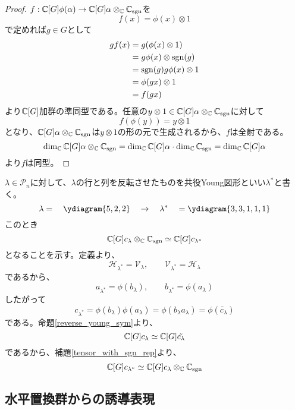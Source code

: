 \documentclass{ltjsreport}
\begin{document}
\begin{proof}
  $f:\mathbb{C}[G]\phi(\alpha)\rightarrow\mathbb{C}[G]\alpha\otimes_{\mathbb{C}} \mathbb{C}_{\mathrm{sgn}}$を
  \[
  f(x)=\phi(x)\otimes 1  
  \]
  で定めれば$g\in G$として
  \begin{align*}
    gf(x)
    &=g(\phi(x)\otimes 1)\\
    &=g\phi(x)\otimes \mathrm{sgn}(g)\\
    &=\mathrm{sgn}(g)g\phi(x)\otimes 1\\
    &=\phi(gx)\otimes 1\\
    &=f(gx)
  \end{align*}
  より$\mathbb{C}[G]$加群の準同型である。任意の$y\otimes 1\in \mathbb{C}[G]\alpha\otimes_{\mathbb{C}} \mathbb{C}_{\mathrm{sgn}}$に対して
  \[
  f(\phi(y))=y\otimes 1  
  \]
  となり、$\mathbb{C}[G]\alpha\otimes_{\mathbb{C}} \mathbb{C}_{\mathrm{sgn}}$は$y\otimes 1$の形の元で生成されるから、$f$は全射である。
  \[
  \dim_{\mathbb{C}}\mathbb{C}[G]\alpha\otimes_{\mathbb{C}} \mathbb{C}_{\mathrm{sgn}}=\dim_{\mathbb{C}}\mathbb{C}[G]\alpha\cdot\dim_{\mathbb{C}}\mathbb{C}_{\mathrm{sgn}}=  \dim_{\mathbb{C}}\mathbb{C}[G]\alpha 
  \]
  より$f$は同型。
\end{proof}


\begin{eg}
  $\lambda\in\mathcal{P}_n$に対して、$\lambda$の行と列を反転させたものを共役Young図形といい$\lambda^*$と書く。
  \[
  \lambda=\quad\ydiagram{5,2,2}\quad\rightarrow\quad\lambda^*\quad=\ydiagram{3,3,1,1,1}
  \]
  このとき
  \[
  \mathbb{C}[G]{c_\lambda}\otimes_{\mathbb{C}}\mathbb{C}_{\mathrm{sgn}}\simeq \mathbb{C}[G]{c_{\lambda^*}}
  \]
  となることを示す。定義より、
  \[
  \mathcal{H}_{\lambda^*}=\mathcal{V}_{\lambda},\qquad
  \mathcal{V}_{\lambda^*}=\mathcal{H}_{\lambda}  
  \]
  であるから、
  \[
  a_{\lambda^*}=\phi(b_{\lambda}),\qquad b_{\lambda^*}=\phi(a_{\lambda})
  \]
  したがって
  \[
  c_{\lambda^*}=\phi(b_\lambda)\phi(a_\lambda)=\phi(b_\lambda a_\lambda)=\phi(\tilde{c_\lambda})  
  \]
  である。命題\ref{reverse_young_sym}より、
  \[
  \mathbb{C}[G]c_\lambda\simeq \mathbb{C}[G]\tilde{c_\lambda}  
  \]
  であるから、補題\ref{tensor_with_sgn_rep}より、
  \[
  \mathbb{C}[G]c_{\lambda^*}\simeq \mathbb{C}[G]c_\lambda\otimes_{\mathbb{C}}\mathbb{C}_{\mathrm{sgn}}  
  \]
\end{eg}



\subsection{水平置換群からの誘導表現}\label{ind_from_horizontal_perm}
\end{document}
